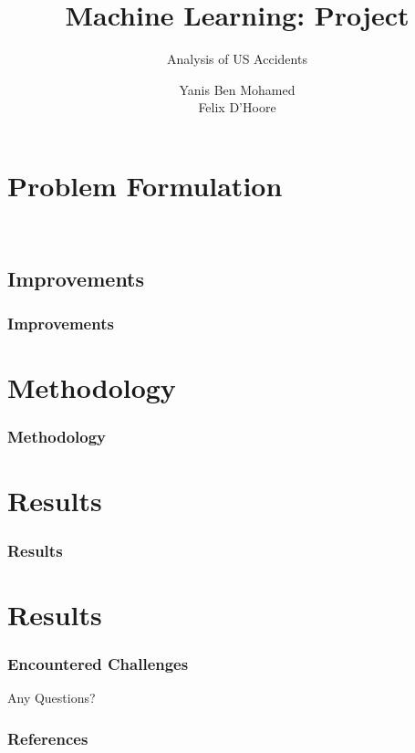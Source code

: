 \documentclass[brugge]{kulakbeamer}
\title[ML: Project]{Machine Learning: Project}
\subtitle{Analysis of US Accidents}
\author[]{Yanis Ben Mohamed \\ Felix D'Hoore}
\institute[Kulak]{Mathias Verbeke\\
        \hspace{25.5mm}Louis Carpentier
}
\begin{document}
\begin{titleframe}
\titlepage
\end{titleframe}

\begin{outlineframe}[Outline]
\tableofcontents[subsectionstyle=hide]
\end{outlineframe}

\section{Problem Formulation}

\

\subsection{Improvements}
\begin{frame}
\frametitle{Improvements}
   
\end{frame}


\section{Methodology}

\begin{frame}
\frametitle{Methodology}

\end{frame}

\section{Results}

\begin{frame}
\frametitle{Results}

\end{frame}

\section{Results}

\begin{frame}
\frametitle{Encountered Challenges}

\end{frame}


\begin{closingframe}
\vspace*{\fill}
\begin{center}
\Huge \color{white}Any Questions?
\end{center}
\end{closingframe}

\begin{closingframe}[allowframebreaks]

\frametitle{\color{white} References}

\begin{thebibliography}{}

\end{thebibliography}
\end{closingframe}
\end{document}
